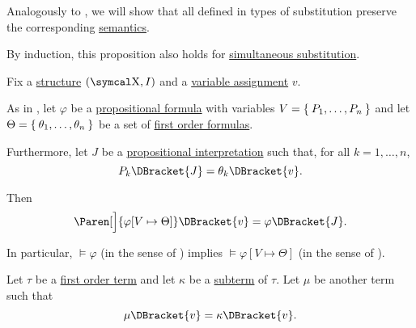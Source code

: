 \begin{proposition}\label{thm:first_order_substitution_equivalence}
  Analogously to , we will show that all defined in  types of substitution preserve the corresponding \hyperref[def:first_order_semantics]{semantics}.

  By induction, this proposition also holds for \hyperref[def:propositional_substitution/simultaneous]{simultaneous substitution}.

  Fix a \hyperref[def:first_order_structure]{structure} \( (\CX, I) \) and a \hyperref[def:first_order_valuation/variable_assignment]{variable assignment} \( v \).

  \begin{PropEnum}
     As in , let \( \varphi \) be a \hyperref[def:propositional_syntax/formula]{propositional formula} with variables \( {V = \Set{ P_1, \ldots, P_n }} \) and let \( \Theta = \Set{ \theta_1, \ldots, \theta_n } \) be a set of \hyperref[def:first_order_syntax/formula]{first order formulas}.

    Furthermore, let \( J \) be a \hyperref[def:propositional_valuation/interpretation]{propositional interpretation} such that, for all \( k = 1, \ldots, n \),
    \begin{equation}\label{eq:thm:first_order_substitution_equivalence/propositional/compatibility}
      P_k\DBracket{J} = \theta_k\DBracket{v}.
    \end{equation}

    Then
    \begin{equation}\label{eq:thm:first_order_substitution_equivalence/propositional}
      \Paren[\Big]{ \varphi[V \mapsto \Theta] }\DBracket{v} = \varphi \DBracket{J}.
    \end{equation}

    In particular, \( \vDash \varphi \) (in the sense of ) implies \( \vDash \varphi[V \mapsto \Theta] \) (in the sense of ).

     Let \( \tau \) be a \hyperref[def:first_order_syntax/term]{first order term} and let \( \kappa \) be a \hyperref[def:first_order_syntax/subterm]{subterm} of \( \tau \). Let \( \mu \) be another term such that
    \begin{equation}\label{eq:thm:first_order_substitution_equivalence/term_in_term/compatibility}
      \mu\DBracket{v} = \kappa\DBracket{v}.
    \end{equation}


\end{PropEnum}
\end{proposition}
